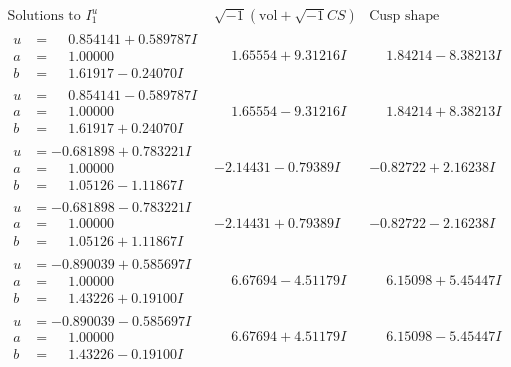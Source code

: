 \documentclass[1p]{elsarticle_modified}
\theoremstyle{definition}
\newcommand{\I}{\sqrt{-1}}
\begin{document}
$$\begin{array}{c|c|c}  
\text{Solutions to }I^u_{1}& \I (\text{vol} + \sqrt{-1}CS) & \text{Cusp shape}\\
 \hline 
\begin{aligned}
u &= \phantom{-}0.854141 + 0.589787 I \\
a &= \phantom{-}1.00000\phantom{ +0.000000I} \\
b &= \phantom{-}1.61917 - 0.24070 I\end{aligned}
 & \phantom{-}1.65554 + 9.31216 I & \phantom{-}1.84214 - 8.38213 I \\ \hline\begin{aligned}
u &= \phantom{-}0.854141 - 0.589787 I \\
a &= \phantom{-}1.00000\phantom{ +0.000000I} \\
b &= \phantom{-}1.61917 + 0.24070 I\end{aligned}
 & \phantom{-}1.65554 - 9.31216 I & \phantom{-}1.84214 + 8.38213 I \\ \hline\begin{aligned}
u &= -0.681898 + 0.783221 I \\
a &= \phantom{-}1.00000\phantom{ +0.000000I} \\
b &= \phantom{-}1.05126 - 1.11867 I\end{aligned}
 & -2.14431 - 0.79389 I & -0.82722 + 2.16238 I \\ \hline\begin{aligned}
u &= -0.681898 - 0.783221 I \\
a &= \phantom{-}1.00000\phantom{ +0.000000I} \\
b &= \phantom{-}1.05126 + 1.11867 I\end{aligned}
 & -2.14431 + 0.79389 I & -0.82722 - 2.16238 I \\ \hline\begin{aligned}
u &= -0.890039 + 0.585697 I \\
a &= \phantom{-}1.00000\phantom{ +0.000000I} \\
b &= \phantom{-}1.43226 + 0.19100 I\end{aligned}
 & \phantom{-}6.67694 - 4.51179 I & \phantom{-}6.15098 + 5.45447 I \\ \hline\begin{aligned}
u &= -0.890039 - 0.585697 I \\
a &= \phantom{-}1.00000\phantom{ +0.000000I} \\
b &= \phantom{-}1.43226 - 0.19100 I\end{aligned}
 & \phantom{-}6.67694 + 4.51179 I & \phantom{-}6.15098 - 5.45447 I \\ \hline\begin{aligned}

\end{aligned}
\end{array}$$
\end{document}
